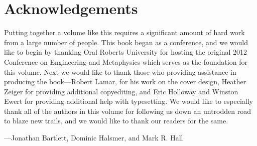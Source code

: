 \chapter*{Acknowledgements}

Putting together a volume like this requires a significant amount of hard work from a large number of people.  This book began as a conference, and we would like to begin by thanking Oral Roberts University for hosting the original 2012 Conference on Engineering and Metaphysics which serves as the foundation for this volume.  Next we would like to thank those who providing assistance in producing the book---Robert Lamar, for his work on the cover design, Heather Zeiger for providing additional copyediting, and Eric Holloway and Winston Ewert for providing additional help with typesetting.  We would like to especially thank all of the authors in this volume for following us down an untrodden road to blaze new trails, and we would like to thank our readers for the same.

\baselineskip

\hfill ---Jonathan Bartlett, Dominic Halsmer, and Mark R. Hall
